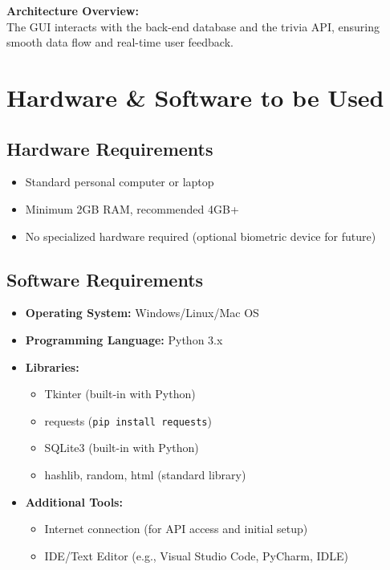\documentclass[12pt,a4paper]{article}
\begin{document}
\textbf{Architecture Overview:}\\
The GUI interacts with the back-end database and the trivia API, ensuring smooth data flow and real-time user feedback.

\section{Hardware \& Software to be Used}

\subsection*{Hardware Requirements}
\begin{itemize}
    \item Standard personal computer or laptop
    \item Minimum 2GB RAM, recommended 4GB+
    \item No specialized hardware required (optional biometric device for future)
\end{itemize}

\subsection*{Software Requirements}
\begin{itemize}
    \item \textbf{Operating System:} Windows/Linux/Mac OS
    \item \textbf{Programming Language:} Python 3.x
    \item \textbf{Libraries:}
    \begin{itemize}
        \item Tkinter (built-in with Python)
        \item requests (\texttt{pip install requests})
        \item SQLite3 (built-in with Python)
        \item hashlib, random, html (standard library)
    \end{itemize}
    \item \textbf{Additional Tools:}
    \begin{itemize}
        \item Internet connection (for API access and initial setup)
        \item IDE/Text Editor (e.g., Visual Studio Code, PyCharm, IDLE)
    \end{itemize}
\end{itemize}
\end{document}
